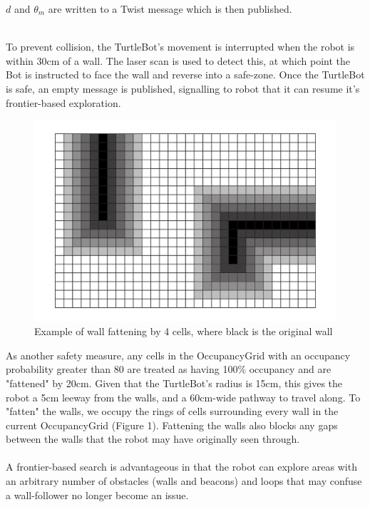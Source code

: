 \documentclass[titlepage,12pt,a4paper]{article}
\begin{document}
\noindent
$d$ and $\theta_m$ are written to a Twist message which is then published.\\
\\


\pagebreak

\noindent
To prevent collision, the TurtleBot's movement is interrupted when the robot is within 30cm of a wall. The laser scan is used to detect this, at which point the Bot is instructed to face the wall and reverse into a safe-zone. Once the TurtleBot is safe, an empty message is published, signalling to robot that it can resume it's frontier-based exploration. \\

\begin{figure}[h]
	\begin{center}
	\includegraphics[scale=0.25]{wallfatten.jpg}
	\caption{Example of wall fattening by 4 cells, where black is the original wall}
	\end{center}
\end{figure}

\noindent
As another safety measure, any cells in the OccupancyGrid with an occupancy probability greater than 80 are treated as having 100\% occupancy and are "fattened" by 20cm. Given that the TurtleBot's radius is 15cm, this gives the robot a 5cm leeway from the walls, and a 60cm-wide pathway to travel along. To "fatten" the walls, we occupy the rings of cells surrounding every wall in the current OccupancyGrid (Figure 1). Fattening the walls also blocks any gaps between the walls that the robot may have originally seen through. \\
\\
A frontier-based search is advantageous in that the robot can explore areas with an arbitrary number of obstacles (walls and beacons) and loops that may confuse a wall-follower no longer become an issue. \\
\end{document}
